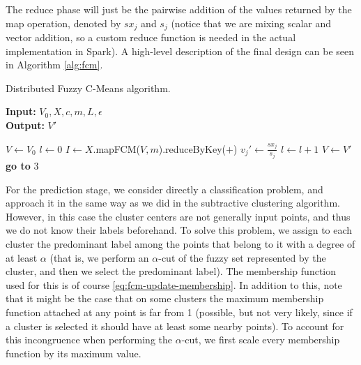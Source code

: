 The reduce phase will just be the pairwise addition of the values returned by the map operation, denoted by $sx_j$ and $s_j$ (notice that we are mixing scalar and vector addition, so a custom reduce function is needed in the actual implementation in Spark). A high-level description of the final design can be seen in Algorithm \ref{alg:fcm}.

\begin{algorithm}
  \caption{Distributed Fuzzy C-Means algorithm.}
    \label{alg:fcm}
    \textbf{Input:} $V_0,X,c,m,L, \epsilon$\\
    \textbf{Output:} $V'$
  \begin{algorithmic}[1]
    \State $V \gets V_0$ 
    \State $l \gets 0$
    \State $I \gets X$.mapFCM($V,m$).reduceByKey($+$) 
     
      \State $\displaystyle v_j' \gets \frac{sx_j}{s_j}$
    \EndFor
    \State $l \gets l+1$
     
      \State {}
    \Else
      \State $V \gets V'$
      \State \textbf{go to} 3
    \EndIf
  \end{algorithmic}
\end{algorithm}

For the prediction stage, we consider directly a classification problem, and approach it in the same way as we did in the subtractive clustering algorithm. However, in this case the cluster centers are not generally input points, and thus we do not know their labels beforehand. To solve this problem, we assign to each cluster the predominant label among the points that belong to it with a degree of at least $\alpha$ (that is, we perform an $\alpha$-cut of the fuzzy set represented by the cluster, and then we select the predominant label). The membership function used for this is of course \eqref{eq:fcm-update-membership}. In addition to this, note that it might be the case that on some clusters the maximum membership function attached at any point is far from 1 (possible, but not very likely, since if a cluster is selected it should have at least some nearby points). To account for this incongruence when performing the $\alpha$-cut, we first scale every membership function by its maximum value.

